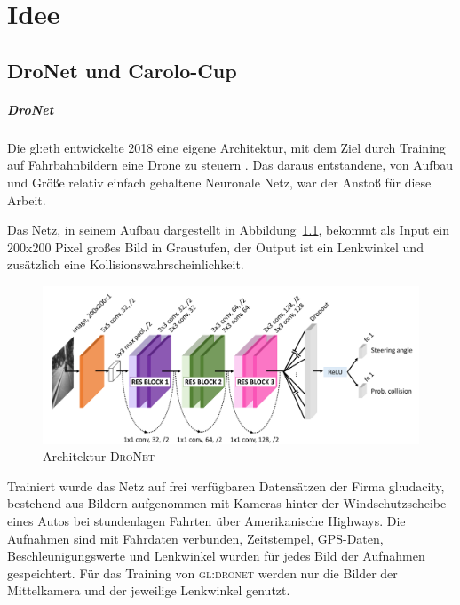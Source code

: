 %
\chapter{Idee}

\section{DroNet und Carolo-Cup}

\paragraph{DroNet}
Die \gls{gl:eth} entwickelte 2018 eine eigene Architektur, mit dem Ziel durch Training auf Fahrbahnbildern eine Drone zu steuern \cite{Loquercio_2018}. 
Das daraus entstandene, von Aufbau und Größe relativ einfach gehaltene Neuronale Netz, war der Anstoß für diese Arbeit. 

Das Netz, in seinem Aufbau dargestellt in Abbildung~\ref{img:DroNet}, bekommt als Input ein 200x200 Pixel großes Bild in Graustufen, der Output ist ein Lenkwinkel und zusätzlich eine Kollisionswahrscheinlichkeit.

\begin{figure}[h]
	\centering
	\includegraphics[scale=0.5]{figures/Architecture-DRONET.png}
	\caption{Architektur \textsc{DroNet}}
	\label{img:DroNet}
\end{figure}

Trainiert wurde das Netz auf frei verfügbaren Datensätzen der Firma \gls{gl:udacity}, bestehend aus Bildern aufgenommen mit Kameras hinter der Windschutzscheibe eines Autos bei stundenlagen Fahrten über Amerikanische Highways. Die Aufnahmen sind mit Fahrdaten verbunden, Zeitstempel, GPS-Daten, Beschleunigungswerte und Lenkwinkel wurden für jedes Bild der Aufnahmen gespeichtert. Für das Training von \textsc{\gls{gl:dronet}} werden nur die Bilder der Mittelkamera und der jeweilige Lenkwinkel genutzt.

